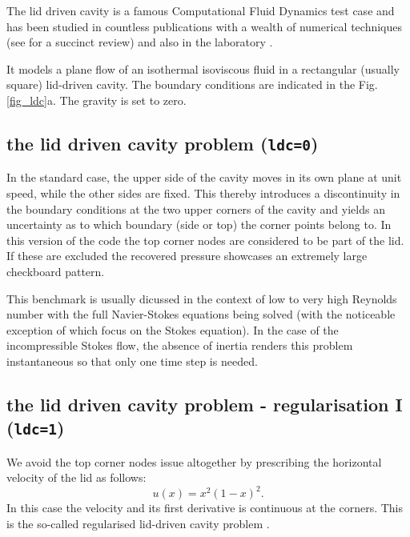 

The lid driven cavity is a famous Computational Fluid Dynamics test case 
\cite{kawa61,ghgs82,paac67,bope98,brsa06,grdn97,shde00}
and has been studied in countless publications with a wealth of numerical techniques
(see \cite{ertu09} for a succinct review) and also in the laboratory \cite{kost84}.

It models a plane flow of an isothermal isoviscous fluid in a rectangular (usually square) lid-driven cavity. 
The boundary conditions are indicated in the Fig. \ref{fig_ldc}a. The gravity is set to zero.

\subsection*{the lid driven cavity problem ({\tt ldc=0})}
In the standard case, the upper side of the cavity moves in its own plane at unit speed, while the other sides are fixed.
This thereby introduces a discontinuity in the boundary conditions at the two upper corners of the cavity and yields
an uncertainty as to which boundary (side or top) the corner points belong to. 
In this version of the code the top corner nodes are considered to be part of the lid. If these are excluded 
the recovered pressure showcases an extremely large checkboard pattern.

This benchmark is usually dicussed in the context of low to very high Reynolds number with the full 
Navier-Stokes equations being solved (with the noticeable exception of \cite{sagl81a,sagl81b,chpc95,eid2005}
which focus on the Stokes equation). 
In the case of the incompressible Stokes flow, 
the absence of inertia renders this problem instantaneous so that only one time step is needed.

\subsection*{the lid driven cavity problem - regularisation I ({\tt ldc=1})}

We avoid the top corner nodes issue altogether by  
prescribing the horizontal velocity of the lid as follows: 
\begin{equation}
u(x)=x^2(1-x)^2.
\end{equation}
In this case the velocity and its first derivative is continuous at the corners. This is the so-called regularised lid-driven cavity problem \cite{piva94}.

